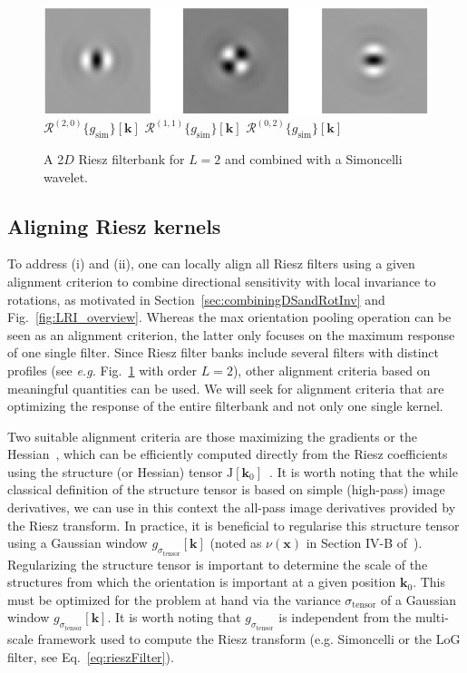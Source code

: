 \documentclass[fleqn,a4paper,oneside,openany]{book}
\begin{document}
%
\begin{figure}
\centering
\includegraphics[trim = 0 0 0 0, clip, width=0.7\linewidth]{Riesz.png}\\
$\mathcal{R}^{(2,0)}
\{g_{\text{sim}}\}[\boldsymbol{k}]$
\hspace{1.3cm}
$\mathcal{R}^{(1,1)}
\{g_{\text{sim}}\}[\boldsymbol{k}]$
\hspace{1.3cm}
$\mathcal{R}^{(0,2)}
\{g_{\text{sim}}\}[\boldsymbol{k}]$
\caption{A 2$D$ Riesz filterbank for $L=2$ and combined with a Simoncelli wavelet.}
  \label{fig:Riesz}
\end{figure}
%
\subsection{Aligning Riesz kernels}\label{sec:RieszAlignment}
To address (i) and (ii), one can locally align all Riesz filters using a given alignment criterion to combine directional sensitivity with local invariance to rotations, as motivated in Section~\ref{sec:combiningDSandRotInv} and Fig.~\ref{fig:LRI_overview}.
Whereas the max orientation pooling operation can be seen as an alignment criterion, the latter only focuses on the maximum response of one single filter.
Since Riesz filter banks include several filters with distinct profiles (see \textit{e.g.} Fig.~\ref{fig:Riesz} with order $L=2$), other alignment criteria based on meaningful quantities can be used.
We will seek for alignment criteria that are optimizing the response of the entire filterbank and not only one single kernel.

Two suitable alignment criteria are those maximizing the gradients or the Hessian~\cite{DMP2017}, which can be efficiently computed directly from the Riesz coefficients using the structure (or Hessian) tensor $\mathrm{J}[\boldsymbol{k}_0]$~\cite{ChU2012}.
It is worth noting that the while classical definition of the structure tensor is based on simple (high-pass) image derivatives, we can use in this context the all-pass image derivatives provided by the Riesz transform.
In practice, it is beneficial to regularise this structure tensor using a Gaussian window $g_{\sigma_{\text{tensor}}}[\boldsymbol{k}]$ (noted as $\nu(\boldsymbol{x})$ in Section IV-B of~\cite{ChU2012}).
Regularizing the structure tensor is important to determine the scale of the structures from which the orientation is important at a given position $\boldsymbol{k}_0$.
This must be optimized for the problem at hand via the variance $\sigma_{\text{tensor}}$ of a Gaussian window $g_{\sigma_{\text{tensor}}}[\boldsymbol{k}]$.
It is worth noting that $g_{\sigma_{\text{tensor}}}$ is independent from the multi-scale framework used to compute the Riesz transform (e.g. Simoncelli or the LoG filter, see Eq.~\eqref{eq:rieszFilter}). 
\end{document}
